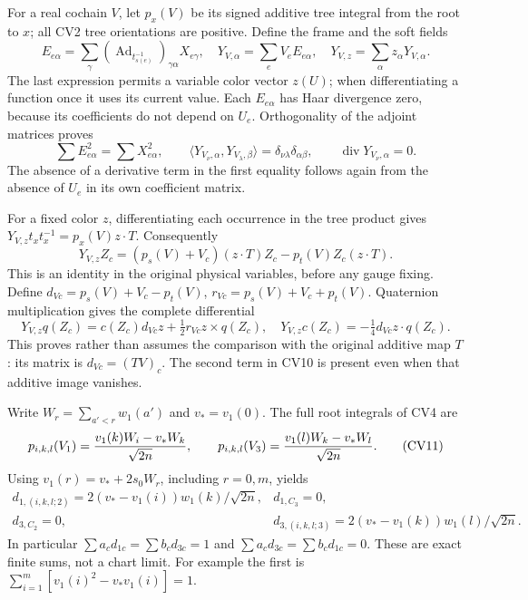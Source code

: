 \documentclass[11pt]{article}
\begin{document}
For a real cochain \(V\), let \(p_x(V)\) be its signed additive tree
integral from the root to \(x\); all CV2 tree orientations are positive.
Define the frame and the soft fields
\[
 E_{e\alpha}=\sum_\gamma
  (\operatorname{Ad}_{t_{s(e)}^{-1}})_{\gamma\alpha}X_{e\gamma},
 \quad Y_{V,\alpha}=\sum_e V_eE_{e\alpha},
 \quad Y_{V,z}=\sum_\alpha z_\alpha Y_{V,\alpha}.          \tag{CV7}
\]
The last expression permits a variable color vector \(z(U)\); when
differentiating a function once it uses its current value.
Each \(E_{e\alpha}\) has Haar divergence zero, because its coefficients
do not depend on \(U_e\). Orthogonality of the adjoint matrices proves
\[
 \sum E_{e\alpha}^2=\sum X_{e\alpha}^2,\qquad
 \langle Y_{V_\nu,\alpha},Y_{V_\lambda,\beta}\rangle
       =\delta_{\nu\lambda}\delta_{\alpha\beta},
 \qquad\operatorname{div}Y_{V_\nu,\alpha}=0.              \tag{CV8}
\]
The absence of a derivative term in the first equality follows again
from the absence of \(U_e\) in its own coefficient matrix.

For a fixed color \(z\), differentiating each occurrence in the tree
product gives \(Y_{V,z}t_xt_x^{-1}=p_x(V)z\cdot T\). Consequently
\[
 Y_{V,z}Z_c=(p_s(V)+V_c)(z\cdot T)Z_c
                    -p_t(V)Z_c(z\cdot T).               \tag{CV9}
\]
This is an identity in the original physical variables, before any
gauge fixing. Define
\(d_{Vc}=p_s(V)+V_c-p_t(V)\), \(r_{Vc}=p_s(V)+V_c+p_t(V)\).
Quaternion multiplication gives the complete differential
\[
 Y_{V,z}q(Z_c)=c(Z_c)d_{Vc}z+\tfrac12r_{Vc}z\times q(Z_c),
 \quad Y_{V,z}c(Z_c)=-\tfrac14d_{Vc}z\cdot q(Z_c).        \tag{CV10}
\]
This proves rather than assumes the comparison with the original
additive map \(T\): its matrix is \(d_{Vc}=(TV)_c\). The second term
in CV10 is present even when that additive image vanishes.

Write \(W_r=\sum_{a'<r}w_1(a')\) and \(v_*=v_1(0)\). The full root
integrals of CV4 are
\[
 p_{i,k,l}(V_1)={v_1(k)W_i-v_*W_k\over\sqrt{2n}},\qquad
 p_{i,k,l}(V_3)={v_1(l)W_k-v_*W_l\over\sqrt{2n}}.         \tag{CV11}
\]
Using \(v_1(r)=v_*+2s_0W_r\), including \(r=0,m\), yields
\[
\begin{array}{ll}
 d_{1,(i,k,l;2)}=2(v_*-v_1(i))w_1(k)/\sqrt{2n},&d_{1,C_3}=0,\\
 d_{3,C_2}=0,&d_{3,(i,k,l;3)}=2(v_*-v_1(k))w_1(l)/\sqrt{2n}.
\end{array}                                                    \tag{CV12}
\]
In particular \(\sum a_cd_{1c}=\sum b_cd_{3c}=1\) and
\(\sum a_cd_{3c}=\sum b_cd_{1c}=0\). These are exact finite sums,
not a chart limit. For example the first is
\(\sum_{i=1}^m[v_1(i)^2-v_*v_1(i)]=1\).
\end{document}
